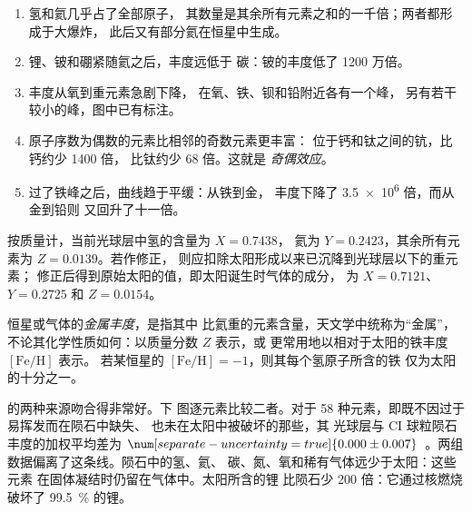 \begin{enumerate}
\item 氢和氦几乎占了全部原子，
  其数量是其余所有元素之和的一千倍；两者都形成于大爆炸，
  此后又有部分氦在恒星中生成。
\item 锂、铍和硼紧随氦之后，丰度远低于
  碳：铍的丰度低了 1200 万倍。
\item 丰度从氧到重元素急剧下降，
  在氧、铁、钡和铅附近各有一个峰，
  另有若干较小的峰，图中已有标注。
\item 原子序数为偶数的元素比相邻的奇数元素更丰富：
  位于钙和钛之间的钪，比钙约少 \num{1400} 倍，
  比钛约少 \num{68} 倍。这就是
  \emph{奇偶效应}。
\item 过了铁峰之后，曲线趋于平缓：从铁到金，
  丰度下降了 \num{3.5e6} 倍，而从金到铅则
  又回升了十一倍。
\end{enumerate}

按质量计，当前光球层中氢的含量为 $X = 0.7438$，
氦为 $Y = 0.2423$，其余所有元素为 $Z = 0.0139$。若作修正，
则应扣除太阳形成以来已沉降到光球层以下的重元素；
修正后得到原始太阳的值，即太阳诞生时气体的成分，
为 $X = 0.7121$、$Y = 0.2725$ 和 $Z = 0.0154$。

\begin{definition}[金属丰度]\label{def:b3:origin-of-elements:metallicity}
恒星或气体的\emph{金属丰度}，是指其中
比氦重的元素含量，天文学中统称为“金属”，
不论其化学性质如何：以质量分数 $Z$ 表示，或
更常用地以相对于太阳的铁丰度 $[\mathrm{Fe/H}]$ 表示。
若某恒星的 $[\mathrm{Fe/H}] = -1$，则其每个氢原子所含的铁
仅为太阳的十分之一。
\end{definition}

的两种来源吻合得非常好。下
图逐元素比较二者。对于 58 种元素，即既不因过于易挥发而在陨石中缺失、
  也未在太阳中被破坏的那些，其
  光球层与 CI 球粒陨石丰度的加权平均差为
$\num[separate-uncertainty=true]{0.000 \pm 0.007}$~。两组
数据偏离了这条线。陨石中的氢、氦、
碳、氮、氧和稀有气体远少于太阳：这些元素
在固体凝结时仍留在气体中。太阳所含的锂
比陨石少 \num{200} 倍：它通过核燃烧
破坏了 \qty{99.5}{\percent} 的锂。

